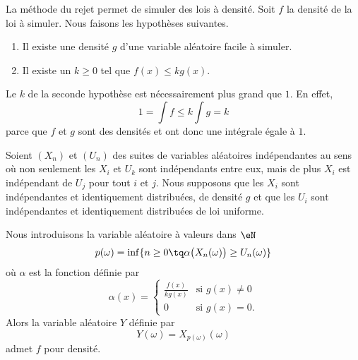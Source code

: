 La méthode du rejet permet de simuler des lois à densité. Soit \( f\) la densité de la loi à simuler. Nous faisons les hypothèses suivantes.
\begin{enumerate}
    \item
        Il existe une densité \( g\) d'une variable aléatoire facile à simuler.
    \item
        Il existe un \( k\geq 0\) tel que \( f(x)\leq kg(x)\).
\end{enumerate}

\begin{remark}
    Le \( k\) de la seconde hypothèse est nécessairement plus grand que \( 1\). En effet,
    \begin{equation}
        1=\int f\leq k\int g=k
    \end{equation}
    parce que \( f\) et \( g\) sont des densités et ont donc une intégrale égale à \( 1\).
\end{remark}

\begin{proposition}
    Soient \( (X_n)\) et \( (U_n)\) des suites de variables aléatoires indépendantes au sens où non seulement les \( X_i\) et \( U_k\) sont indépendants entre eux, mais de plus \( X_i\) est indépendant de \( U_j\) pour tout \( i\) et \( j\). Nous supposons que les \( X_i\) sont indépendantes et identiquement distribuées, de densité \( g\) et que les \( U_i\) sont indépendantes et identiquement distribuées de loi uniforme.

    Nous introduisons la variable aléatoire à valeurs dans \( \eN\)
    \begin{equation}
        p(\omega)=\inf\{ n\geq 0\tq \alpha\big( X_n(\omega) \big)\geq U_n(\omega) \}
    \end{equation}
    où \( \alpha\) est la fonction définie par
    \begin{equation}
        \alpha(x)=\begin{cases}
            \frac{ f(x) }{ kg(x) }    &   \text{si } g(x)\neq 0\\
            0    &    \text{si } g(x)=0.
        \end{cases}
    \end{equation}
    Alors la variable aléatoire \( Y\) définie par 
    \begin{equation}
        Y(\omega)=X_{p(\omega)}(\omega)
    \end{equation}
    admet \( f\) pour densité.
\end{proposition}

